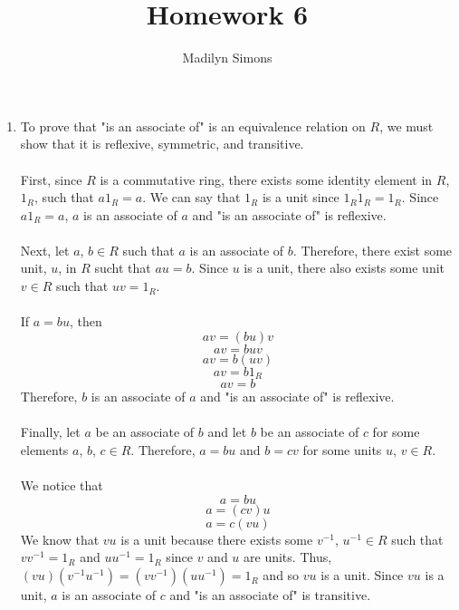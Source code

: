 \documentclass{article}
\title{Homework 6}
\author{Madilyn Simons}
\date{}
\begin{document}
\maketitle

\begin{enumerate}

\item To prove that "is an associate of" is an equivalence relation on $R$, we
must show that it is reflexive, symmetric, and transitive.
\\
\\
First, since $R$ is a commutative ring, there exists some identity element in
$R$, $1_R$, such that $a1_R = a$.  We can say that $1_R$ is a unit since
$1_{R} \dot 1_{R} = 1_{R}$.  Since $a1_R = a$, $a$ is an associate of $a$
and "is an associate of" is reflexive.
\\
\\
Next, let $a$, $b \in R$ such that $a$ is an associate of $b$.  Therefore,
there exist some unit, $u$, in $R$ sucht that $au = b$.  Since $u$ is a unit,
there also exists some unit $v \in R$ such that $uv = 1_R$.
\\
\\
If $a = bu$, then
\[
av = (bu)v
\] \[
av = buv
\] \[
av = b(uv)
\] \[
av = b1_{R}
\] \[
av = b
\]
Therefore, $b$ is an associate of $a$ and "is an associate of" is reflexive.
\\
\\
Finally, let $a$ be an associate of $b$ and let $b$ be an associate of $c$ for
some elements $a$, $b$, $c \in R$.  Therefore, $a = bu$ and $b = cv$ for some
units $u$, $v \in R$.
\\
\\
We notice that
\[
a = bu
\] \[
a = (cv)u
\] \[
a = c(vu)
\]
We know that $vu$ is a unit because there exists some
$v^{-1}$, $u^{-1} \in R$ such that $vv^{-1} = 1_R$ and $uu^{-1} = 1_R$ since
$v$ and $u$ are units.  Thus, $(vu)(v^{-1}u^{-1}) = (vv^{-1})(uu^{-1}) = 1_R$
and so $vu$ is a unit.  Since $vu$ is a unit, $a$ is an associate of $c$ and
"is an associate of" is transitive.

\end{enumerate}
\end{document}
